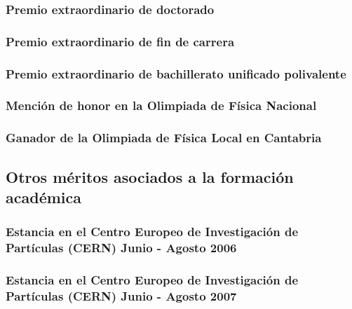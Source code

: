 \documentclass[a4paper, 11pt, twoside, openright]{report}
\begin{document}
\subsubsection{Premio extraordinario de doctorado}


\subsubsection{Premio extraordinario de fin de carrera}


\subsubsection{Premio extraordinario de bachillerato unificado polivalente}


\subsubsection{Mención de honor en la Olimpiada de Física Nacional}


\subsubsection{Ganador de la Olimpiada de Física Local en Cantabria}


\subsection{Otros méritos asociados a la formación académica}

\subsubsection{Estancia en el Centro Europeo de Investigación de Partículas (CERN) Junio - Agosto 2006}


\subsubsection{Estancia en el Centro Europeo de Investigación de Partículas (CERN) Junio - Agosto 2007}

\end{document}
